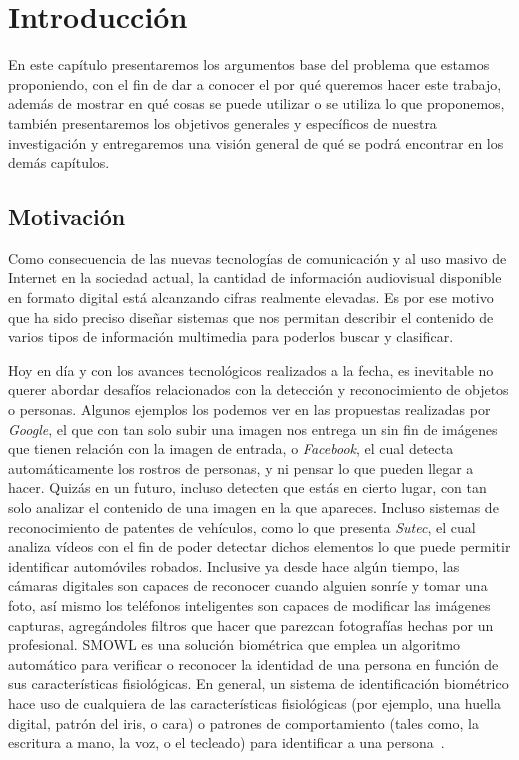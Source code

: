 \chapter[Introducción]{Introducción}\label{ch:capitulo1}
En este capítulo presentaremos los argumentos base del problema que estamos proponiendo, con el fin de dar a conocer el por qué queremos hacer este trabajo, además de mostrar en qué cosas se puede utilizar o se utiliza lo que proponemos, también presentaremos los objetivos generales y específicos de nuestra investigación y entregaremos una visión general de qué se podrá encontrar en los demás capítulos.


\section{Motivación}\label{chsub:Motivación}

Como consecuencia de las nuevas tecnologías de comunicación y al uso masivo de Internet en la sociedad actual, la cantidad de información audiovisual disponible en formato digital está alcanzando cifras realmente elevadas. Es por ese motivo que ha sido preciso diseñar sistemas que nos permitan describir el contenido de varios tipos de información multimedia para poderlos buscar y clasificar. 

Hoy en día y con los avances tecnológicos realizados a la fecha, es inevitable no querer abordar desafíos relacionados con la detección y reconocimiento de objetos o personas. Algunos ejemplos los podemos ver en las propuestas realizadas por \textit{Google}, el que con tan solo subir una imagen nos entrega un sin fin de imágenes que tienen relación con la imagen de entrada, o \textit{Facebook}, el cual detecta automáticamente los rostros de personas, y ni pensar lo que pueden llegar a hacer. Quizás en un futuro, incluso detecten que estás en cierto lugar, con tan solo analizar el contenido de una imagen en la que apareces. Incluso sistemas de reconocimiento de patentes de vehículos, como lo que presenta \textit{Sutec}, el cual analiza vídeos con el fin de poder detectar dichos elementos lo que puede permitir identificar automóviles robados. Inclusive ya desde hace algún tiempo, las cámaras digitales son capaces de reconocer cuando alguien sonríe y tomar una foto, así mismo los teléfonos inteligentes son capaces de modificar las imágenes capturas, agregándoles filtros que hacer que parezcan fotografías hechas por un profesional. SMOWL es una solución biométrica que emplea un algoritmo automático para verificar o reconocer la identidad de una persona en función de sus características fisiológicas. En general, un sistema de identificación biométrico hace uso de cualquiera de las características fisiológicas (por ejemplo, una huella digital, patrón del iris, o cara) o patrones de comportamiento (tales como, la escritura a mano, la voz, o el tecleado) para identificar a una persona~\cite{SMOWL}.

